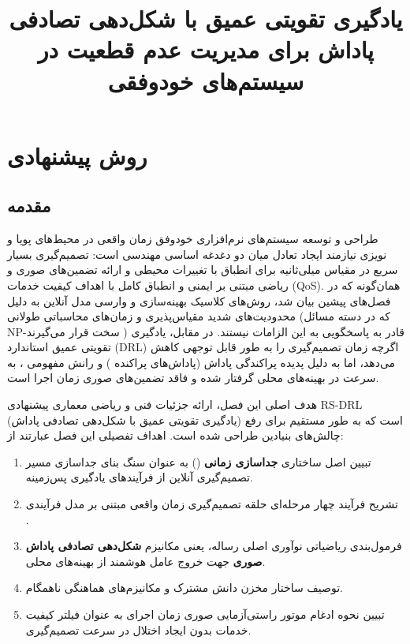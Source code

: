 \documentclass[oneside,openany,phd]{TMU-Thesis}
\title{یادگیری تقویتی عمیق با شکل‌دهی تصادفی پاداش برای مدیریت عدم قطعیت در سیستم‌های خودوفقی}
\begin{document}
\AutoPersianDigits




\setcounter{chapter}{3}



\chapter{روش پیشنهادی}

\label{ch:chapter5-process}



\section{مقدمه}

\label{sec:ch4_intro}



طراحی و توسعه سیستم‌های نرم‌افزاری خودوفق زمان واقعی در محیط‌های پویا و نویزی نیازمند ایجاد تعادل میان دو دغدغه اساسی مهندسی است: تصمیم‌گیری بسیار سریع در مقیاس میلی‌ثانیه برای انطباق با تغییرات محیطی و ارائه تضمین‌های صوری و ریاضی مبتنی بر ایمنی و انطباق کامل با اهداف کیفیت خدمات (QoS). همان‌گونه که در فصل‌های پیشین بیان شد، روش‌های کلاسیک بهینه‌سازی و وارسی مدل آنلاین به دلیل محدودیت‌های شدید مقیاس‌پذیری و زمان‌های محاسباتی طولانی (که در دسته مسائل NP-سخت قرار می‌گیرند \cite{garey1979computers, coker2015sass}) قادر به پاسخگویی به این الزامات نیستند. در مقابل، یادگیری تقویتی عمیق استاندارد (DRL) اگرچه زمان تصمیم‌گیری را به طور قابل توجهی کاهش می‌دهد، اما به دلیل پدیده پراکندگی پاداش (پاداش‌های پراکنده \cite{du2023alleviating}) و رانش مفهومی \cite{gheibi2024dealing}، به سرعت در بهینه‌های محلی گرفتار شده و فاقد تضمین‌های صوری زمان اجرا است.



هدف اصلی این فصل، ارائه جزئیات فنی و ریاضی معماری پیشنهادی RS-DRL (یادگیری تقویتی عمیق با شکل‌دهی تصادفی پاداش) است که به طور مستقیم برای رفع چالش‌های بنیادین طراحی شده است. اهداف تفصیلی این فصل عبارتند از:

\begin{enumerate}

\item تبیین اصل ساختاری \textbf{جداسازی زمانی} () به عنوان سنگ بنای جداسازی مسیر تصمیم‌گیری آنلاین از فرآیندهای یادگیری پس‌زمینه.

\item تشریح فرآیند چهار مرحله‌ای حلقه تصمیم‌گیری زمان واقعی مبتنی بر مدل فرآیندی .

\item فرمول‌بندی ریاضیاتی نوآوری اصلی رساله، یعنی مکانیزم \textbf{شکل‌دهی تصادفی پاداش صوری} جهت خروج عامل هوشمند از بهینه‌های محلی.

\item توصیف ساختار مخزن دانش مشترک و مکانیزم‌های هماهنگی ناهمگام.

\item تبیین نحوه ادغام موتور راستی‌آزمایی صوری زمان اجرای  به عنوان فیلتر کیفیت خدمات بدون ایجاد اختلال در سرعت تصمیم‌گیری.

\end{enumerate}
\end{document}
